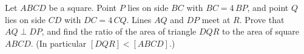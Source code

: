 Let $ABCD$ be a square. Point $P$ lies on side $BC$ with $BC=4\,BP$, and point $Q$ lies on side $CD$ with $DC=4\,CQ$. Lines $AQ$ and $DP$ meet at $R$. Prove that $AQ\perp DP$, and find the ratio of the area of triangle $DQR$ to the area of square $ABCD$. (In particular $[DQR]<[ABCD]$.)
